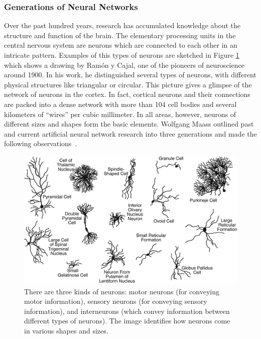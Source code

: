 \subsubsection{Generations of Neural Networks}
Over the past hundred years, research has accumulated knowledge about the structure and function of the brain. The elementary processing units in the central nervous system are neurons which are connected to each other in an intricate pattern. Examples of this types of neurons are sketched in Figure \ref{fig:NeuronTypes} which shows a drawing by Ram\'on y Cajal, one of the pioneers of neuroscience around 1900. In his work, he distinguished several types of neurons, with different physical structures like triangular or circular. This picture gives a glimpse of the network of neurons in the cortex. In fact, cortical neurons and their connections are packed into a dense network with more than 104 cell bodies and several kilometers of ``wires'' per cubic millimeter. In all areas, however, neurons of different sizes and shapes form the basic elements. Wolfgang Maass %
outlined past and current artificial neural network research into three generations and made the following observations~\cite{Maass1996}.

\begin{figure}[ht]
    \centering
    \includegraphics[scale=0.7]{images/Figure1Neuron_Types.png}
    \caption[Types of neurons]{\small{There are three kinds of neurons: motor neurons (for conveying motor information), sensory neurons (for conveying sensory information), and interneurons (which convey information between different types of neurons). The image identifies how neurons come in various shapes and sizes.}}
    \label{fig:NeuronTypes}
\end{figure}

